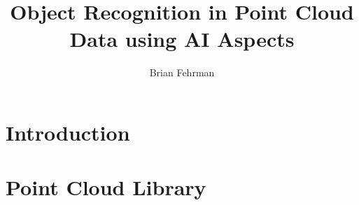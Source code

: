 \documentclass[11pt,letterpaper]{report}
\author{Brian Fehrman}
\title{Object Recognition in Point Cloud Data using AI Aspects}
\begin{document}
\maketitle

\section*{Introduction}


\section*{Point Cloud Library}




\end{document}
